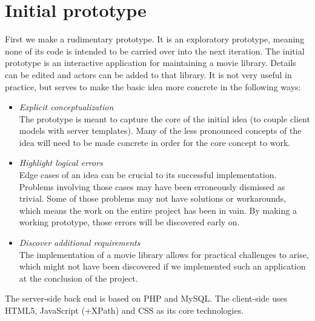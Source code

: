 \chapter{Initial prototype}
First we make a rudimentary prototype. It is an exploratory prototype,
meaning none of its code is intended to be carried over into the next iteration.
The initial prototype is an interactive application for maintaining a movie
library. Details can be edited and actors can be added to that library.
It is not very useful in practice, but serves to make the basic idea more
concrete in the following ways:

\label{list:prototype-motivation}
\begin{itemize}
	\item \emph{Explicit conceptualization}\\
	The prototype is meant to capture the core of the initial idea (to couple
	client models with server templates).
	Many of the less pronounced concepts of the idea will need to be made concrete
	in order for the core concept to work.
	\item \emph{Highlight logical errors}\\
	Edge cases of an idea can be crucial to its successful implementation.
	Problems involving those cases may have been erroneously dismissed as trivial.
	Some of those problems may not have solutions or workarounds, which
	means the work on the entire project has been in vain. By making a working
	prototype, those errors will be discovered early on.
	\item \emph{Discover additional requirements}\\
	The implementation of a movie library allows for practical challenges to
	arise, which might not have been discovered if we implemented such an
	application at the conclusion of the project.
\end{itemize}

The server-side back end is based on PHP and MySQL. The client-side uses
HTML5, JavaScript (+XPath) and CSS as its core technologies.

